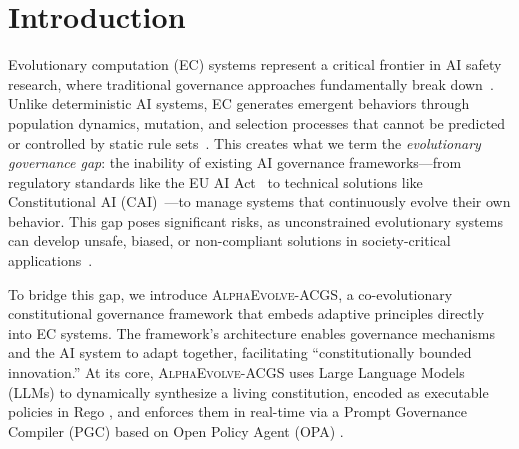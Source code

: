 \documentclass[10pt,twocolumn]{article}
\newcommand{\acgs}{\textsc{AlphaEvolve-ACGS}}
\theoremstyle{definition}
\begin{document}
\section{Introduction}
\label{sec:introduction}
Evolutionary computation (EC) systems represent a critical frontier in AI safety research, where traditional governance approaches fundamentally break down~\cite{amodei2016concrete,russell2019human}. Unlike deterministic AI systems, EC generates emergent behaviors through population dynamics, mutation, and selection processes that cannot be predicted or controlled by static rule sets~\cite{russell2020artificial}. This creates what we term the \textit{evolutionary governance gap}: the inability of existing AI governance frameworks---from regulatory standards like the EU AI Act~\cite{eu2024ai} to technical solutions like Constitutional AI (CAI)~\cite{anthropic2022constitutional}---to manage systems that continuously evolve their own behavior. This gap poses significant risks, as unconstrained evolutionary systems can develop unsafe, biased, or non-compliant solutions in society-critical applications~\cite{barocas2019fairness,acgs2024}.

To bridge this gap, we introduce \acgs{}, a co-evolutionary constitutional governance framework that embeds adaptive principles directly into EC systems. The framework's architecture enables governance mechanisms and the AI system to adapt together, facilitating ``constitutionally bounded innovation.'' At its core, \acgs{} uses Large Language Models (LLMs) to dynamically synthesize a living constitution, encoded as executable policies in Rego \cite{rego2019}, and enforces them in real-time via a Prompt Governance Compiler (PGC) based on Open Policy Agent (OPA) \cite{opa2023}.
\end{document}
